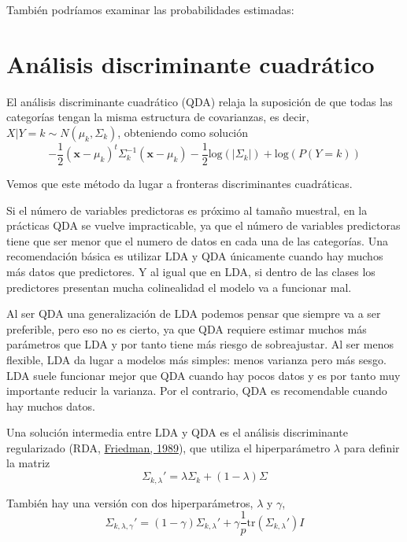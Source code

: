 \documentclass[
]{book}
\newenvironment{Shaded}{\begin{snugshade}}{\end{snugshade}}
\newcommand{\NormalTok}[1]{#1}
\newcommand{\OtherTok}[1]{\textcolor[rgb]{0.56,0.35,0.01}{#1}}
\newcommand{\SpecialCharTok}[1]{\textcolor[rgb]{0.00,0.00,0.00}{#1}}
\theoremstyle{break}
\theoremstyle{nonumberplain}
\begin{document}
También podríamos examinar las probabilidades estimadas:

\begin{Shaded}
\end{Shaded}

\hypertarget{clas-qda}{%
\section{Análisis discriminante cuadrático}\label{clas-qda}}

El análisis discriminante cuadrático (QDA) relaja la suposición de que todas las categorías tengan la misma estructura de covarianzas, es decir, \(X | Y = k \sim N(\mu_k, \Sigma_k)\), obteniendo como solución
\[-\frac{1}{2} (\mathbf{x} - \mu_k)^t \Sigma^{-1}_k (\mathbf{x} - \mu_k) - \frac{1}{2} \mbox{log}(|\Sigma_k|) + \mbox{log}(P(Y = k))\]

Vemos que este método da lugar a fronteras discriminantes cuadráticas.

Si el número de variables predictoras es próximo al tamaño muestral, en la prácticas QDA se vuelve impracticable, ya que el número de variables predictoras tiene que ser menor que el numero de datos en cada una de las categorías. Una recomendación básica es utilizar LDA y QDA únicamente cuando hay muchos más datos que predictores. Y al igual que en LDA, si dentro de las clases los predictores presentan mucha colinealidad el modelo va a funcionar mal.

Al ser QDA una generalización de LDA podemos pensar que siempre va a ser preferible, pero eso no es cierto, ya que QDA requiere estimar muchos más parámetros que LDA y por tanto tiene más riesgo de sobreajustar. Al ser menos flexible, LDA da lugar a modelos más simples: menos varianza pero más sesgo. LDA suele funcionar mejor que QDA cuando hay pocos datos y es por tanto muy importante reducir la varianza. Por el contrario, QDA es recomendable cuando hay muchos datos.

Una solución intermedia entre LDA y QDA es el análisis discriminante regularizado (RDA, \protect\hyperlink{ref-friedman1989regularized}{Friedman, 1989}), que utiliza el hiperparámetro \(\lambda\) para definir la matriz
\[\Sigma_{k,\lambda}' = \lambda\Sigma_k + (1 - \lambda) \Sigma\]

También hay una versión con dos hiperparámetros, \(\lambda\) y \(\gamma\),
\[\Sigma_{k,\lambda,\gamma}' = (1 - \gamma) \Sigma_{k,\lambda}' + \gamma \frac{1}{p} \mbox{tr} (\Sigma_{k,\lambda}')I\]
\end{document}
